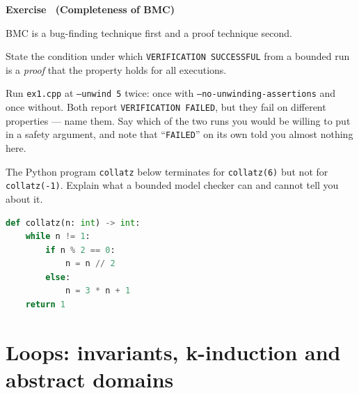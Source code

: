 \documentclass[11pt,a4paper]{article}
\newcommand{\flag}[1]{\texttt{\small #1}}
\newcommand{\file}[1]{\texttt{\small #1}}
\newcounter{exc}
\renewcommand{\theexc}{\arabic{exc}}
\newenvironment{exercise}[2][]
  {\stepcounter{exc}\ifx\relax#1\relax\else\excref{#1}\fi%
   \medskip\noindent\textbf{Exercise \theexc\ (#2)}\par\nopagebreak\smallskip}
  {\par\medskip}
\begin{document}
\begin{exercise}{Completeness of BMC}
BMC is a bug-finding technique first and a proof technique second.

\begin{parts}
  \item State the condition under which \texttt{VERIFICATION SUCCESSFUL} from a
        bounded run is a \emph{proof} that the property holds for all
        executions.
  \item Run \file{ex1.cpp} at \flag{--unwind 5} twice: once with
        \flag{--no-unwinding-assertions} and once without. Both report
        \texttt{VERIFICATION FAILED}, but they fail on different properties ---
        name them. Say which of the two runs you would be willing to put in a
        safety argument, and note that ``\texttt{FAILED}'' on its own told you
        almost nothing here.
  \item The Python program \file{collatz} below terminates for
        \texttt{collatz(6)} but not for \texttt{collatz(-1)}. Explain what a
        bounded model checker can and cannot tell you about it.

\begin{lstlisting}[language=Python]
def collatz(n: int) -> int:
    while n != 1:
        if n % 2 == 0:
            n = n // 2
        else:
            n = 3 * n + 1
    return 1
\end{lstlisting}
\end{parts}
\end{exercise}

\section{Loops: invariants, k-induction and abstract domains}
\end{document}
